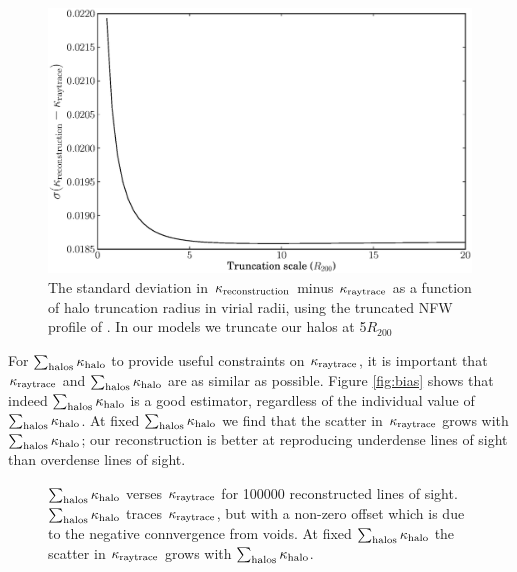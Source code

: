 \documentclass[useAMS,usenatbib]{mn2e}
\begin{document}
\begin{figure}
\includegraphics[width=\columnwidth]{figs/truncation_scatter.eps}
\caption[magcut]{The standard deviation in $\kappa_{\rm reconstruction}$ minus $\kappa_{\rm raytrace}$ as a function of halo truncation radius in virial radii, using the truncated NFW profile of \citet{BMO}. In our models we truncate our halos at 5$R_{200}$}
\label{fig:ScattervsTruncation}
\end{figure}

For $\sum_{\rm halos} \kappa_{\rm halo}$ to provide useful constraints on $\kappa_{\rm raytrace}$, it is important that $\kappa_{\rm raytrace}$ and $\sum_{\rm halos} \kappa_{\rm halo}$ are as similar as possible. Figure \ref{fig:bias} shows that indeed $\sum_{\rm halos} \kappa_{\rm halo}$ is a good estimator, regardless of the individual value of $\sum_{\rm halos} \kappa_{\rm halo}$. At fixed $\sum_{\rm halos} \kappa_{\rm halo}$ we find that the scatter in $\kappa_{\rm raytrace}$ grows with $\sum_{\rm halos} \kappa_{\rm halo}$; our reconstruction is better at reproducing underdense lines of sight than overdense lines of sight.

\begin{figure}
\caption[Biased?]{$\sum_{\rm halos} \kappa_{\rm halo}$ verses $\kappa_{\rm raytrace}$ for 100000 reconstructed lines of sight. $\sum_{\rm halos} \kappa_{\rm halo}$ traces $\kappa_{\rm raytrace}$, but with a non-zero offset which is due to the negative connvergence from voids. At fixed $\sum_{\rm halos} \kappa_{\rm halo}$ the scatter in $\kappa_{\rm raytrace}$ grows with $\sum_{\rm halos} \kappa_{\rm halo}$.}
\label{fig:isitbiased}
\end{figure}
\end{document}
